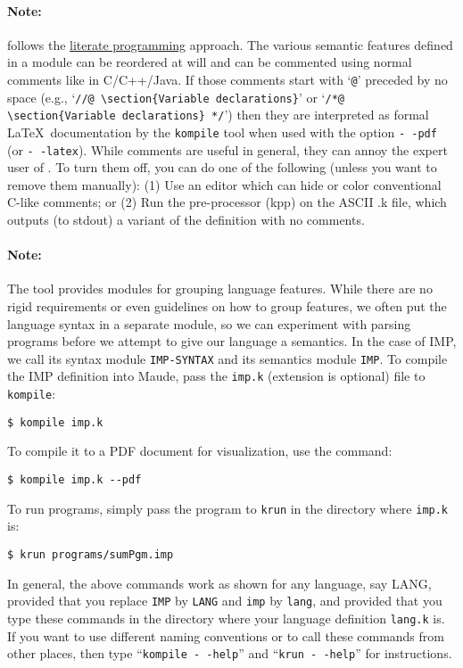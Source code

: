 \begin{latexComment}
\paragraph{Note:}{
\K follows the
\href{https://en.wikipedia.org/wiki/Literate_programming}{literate
programming} approach.  The various semantic features defined in a \K
module can be reordered at will and can be commented using normal
comments like in C/C++/Java.  If those comments start with
`\texttt{@}' preceded by no space (e.g.,
`\texttt{//@ {\textbackslash}section\{Variable declarations\}}'
or
`\texttt{/*@ {\textbackslash}section\{Variable declarations\} */}')
then they are interpreted as formal \LaTeX\ documentation by the
\texttt{kompile} tool when used with the option \texttt{-\,\!-pdf}
(or \texttt{-\,\!-latex}).
While comments are useful in general, they can annoy the expert user
of \K.  To turn them off, you can do one of the following (unless you
want to remove them manually): (1) Use an editor which can hide or
color conventional C-like comments; or (2) Run the \K pre-processor
(kpp) on the ASCII .k file, which outputs (to stdout) a variant of the
\K definition with no comments.
}

\paragraph{Note:}{
The \K tool provides modules for grouping language features.  While
there are no rigid requirements or even guidelines on how to group
features, we often put the language syntax in a separate module, so we
can experiment with parsing programs before we attempt to give our
language a semantics.  In the case of IMP, we call its syntax module
\texttt{IMP-SYNTAX} and its semantics module \texttt{IMP}.  To compile
the IMP definition into Maude, pass the \texttt{imp.k}
(extension is optional) file to \texttt{kompile}:
\begin{verbatim}
$ kompile imp.k
\end{verbatim}
To compile it to a PDF document for visualization, use the command:
\begin{verbatim}
$ kompile imp.k --pdf
\end{verbatim}
To run programs, simply pass the program to \texttt{krun} in the
directory where \texttt{imp.k} is:
\begin{verbatim}
$ krun programs/sumPgm.imp
\end{verbatim}
In general, the above commands work as shown for any language, say
LANG, provided that you replace \texttt{IMP} by \texttt{LANG} and
\texttt{imp} by \texttt{lang}, and provided that you type these
commands in the directory where your language definition
\texttt{lang.k} is.  If you want to use different naming
conventions or to call these commands from other places, then type
``\texttt{kompile -\,\!-help}'' and ``\texttt{krun -\,\!-help}'' for
instructions.
}


\end{latexComment}
